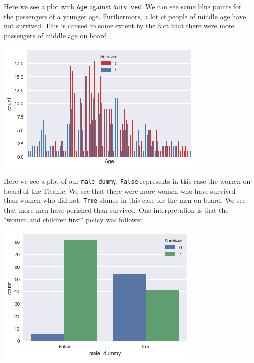 \documentclass[11pt]{article}
\begin{document}
Here we see a plot with \texttt{Age} against \texttt{Survived}. We can see some blue points for the passengers of a younger age. Furthermore, a lot of people of middle age have not survived. This is caused to some extent by the fact that there were more passengers of middle age on board.




\begin{center}
\includegraphics[width=.9\linewidth]{obipy-resources/b207b8ecf66cdede2d5455fb7467ce47-17581ADz.png}
\end{center}

Here we see a plot of our \texttt{male\_dummy}. \texttt{False} represents in this case the women on board of the Titanic. We see that there were more women who have survived than women who did not. \texttt{True} stands in this case for the men on board. We see that more men have perished than survived. One interpretation is that the "women and children first" policy was followed.

\begin{center}
\includegraphics[width=.9\linewidth]{obipy-resources/b207b8ecf66cdede2d5455fb7467ce47-17581MoC.png}
\end{center}
\end{document}
